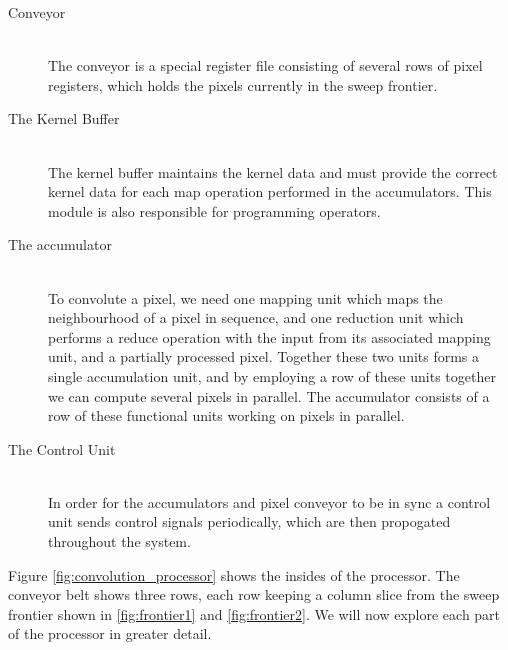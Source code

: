 \begin{description}
    \item[Conveyor] \hfill\\ 
        The conveyor is a special register file consisting of several rows of pixel registers, which holds the pixels currently in the sweep frontier.
    \item[The Kernel Buffer] \hfill\\
        The kernel buffer maintains the kernel data and must provide the correct kernel data for each map operation performed in the accumulators.
        This module is also responsible for programming operators.
    \item[The accumulator] \hfill\\
        To convolute a pixel, we need one mapping unit which maps the neighbourhood of a pixel in sequence, and one reduction unit which performs a reduce operation with the input from its associated mapping unit, and a partially processed pixel.
        Together these two units forms a single accumulation unit, and by employing a row of these units together we can compute several pixels in parallel.
        The accumulator consists of a row of these functional units working on pixels in parallel.
    \item[The Control Unit] \hfill\\
        In order for the accumulators and pixel conveyor to be in sync a control unit sends control signals periodically, which are then propogated throughout the system.
\end{description}

Figure \ref{fig:convolution_processor} shows the insides of the processor. 
The conveyor belt shows three rows, each row keeping a column slice from the sweep frontier shown in \ref{fig:frontier1} and \ref{fig:frontier2}.
We will now explore each part of the processor in greater detail.

